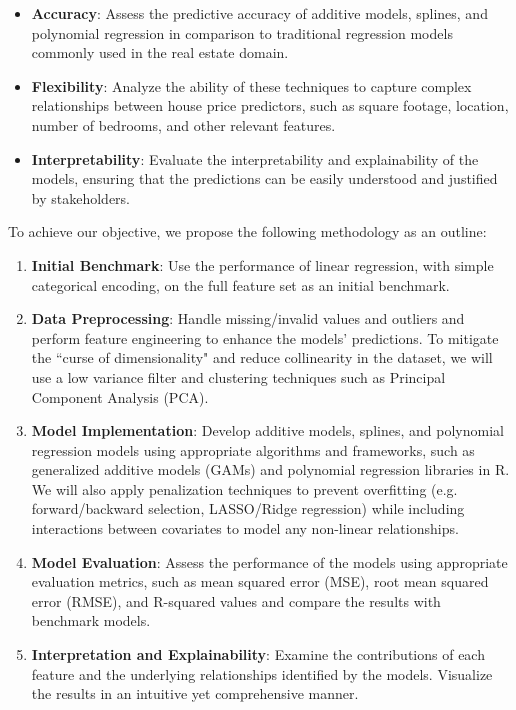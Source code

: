 \documentclass[aoas]{imsart}
\numberwithin{equation}{section}
\theoremstyle{plain}
\theoremstyle{remark}
\begin{document}
\begin{itemize}
\item
  \textbf{Accuracy}: Assess the predictive accuracy of additive models,
  splines, and polynomial regression in comparison to traditional
  regression models commonly used in the real estate domain.
    \vspace{0.2cm}
\item
  \textbf{Flexibility}: Analyze the ability of these techniques to
  capture complex relationships between house price predictors, such as
  square footage, location, number of bedrooms, and other relevant
  features.
  \vspace{0.2cm}
\item
  \textbf{Interpretability}: Evaluate the interpretability and
  explainability of the models, ensuring that the predictions can be
  easily understood and justified by stakeholders.
  \vspace{0.2cm}
\end{itemize}
To achieve our objective, we propose the following methodology as an
outline:

\begin{enumerate}
\item
  \textbf{Initial Benchmark}: Use the performance of linear regression, with simple categorical encoding, on the full
  feature set as an initial benchmark.
  \vspace{0.2cm}
\item
  \textbf{Data Preprocessing}: Handle missing/invalid values and outliers and perform feature engineering to enhance
  the models' predictions. To mitigate the ``curse of dimensionality" and reduce collinearity in the dataset, we
   will use a low variance filter and clustering techniques such as Principal Component Analysis (PCA).
   \vspace{0.2cm}
\item
  \textbf{Model Implementation}: Develop additive models, splines, and
  polynomial regression models using appropriate algorithms and
  frameworks, such as generalized additive models (GAMs) and polynomial
  regression libraries in R. We will also apply penalization techniques
  to prevent overfitting (e.g. forward/backward selection, LASSO/Ridge regression)
  while including interactions between covariates to model any non-linear relationships.
  \vspace{0.2cm}
\item
  \textbf{Model Evaluation}: Assess the performance of the models using
  appropriate evaluation metrics, such as mean squared error (MSE), root
  mean squared error (RMSE), and R-squared values and compare the
  results with benchmark models.
  \vspace{0.2cm}
\item
  \textbf{Interpretation and Explainability}: Examine the contributions of each
  feature and the underlying relationships identified by the models. Visualize the results in an intuitive yet
  comprehensive manner.
\end{enumerate}
\end{document}
